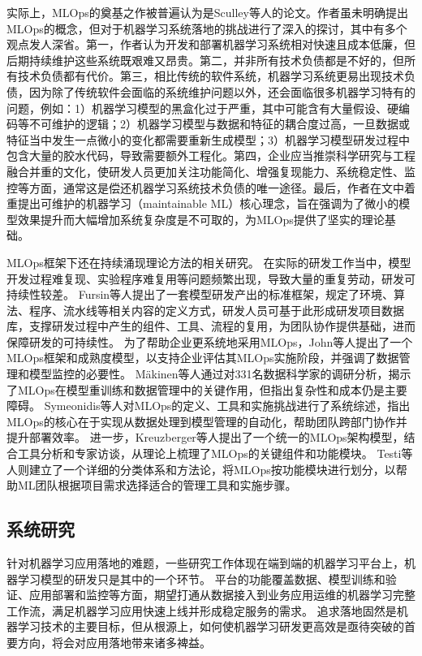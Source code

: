 实际上，MLOps的奠基之作被普遍认为是Sculley等人的论文\cite{Scu15}。作者虽未明确提出MLOps的概念，但对于机器学习系统落地的挑战进行了深入的探讨，其中有多个观点发人深省。第一，作者认为开发和部署机器学习系统相对快速且成本低廉，但后期持续维护这些系统既艰难又昂贵。第二，并非所有技术负债都是不好的，但所有技术负债都有代价。第三，相比传统的软件系统，机器学习系统更易出现技术负债，因为除了传统软件会面临的系统维护问题以外，还会面临很多机器学习特有的问题，例如：1）机器学习模型的黑盒化过于严重，其中可能含有大量假设、硬编码等不可维护的逻辑；2）机器学习模型与数据和特征的耦合度过高，一旦数据或特征当中发生一点微小的变化都需要重新生成模型；3）机器学习模型研发过程中包含大量的胶水代码，导致需要额外工程化。第四，企业应当推崇科学研究与工程融合并重的文化，使研发人员更加关注功能简化、增强复现能力、系统稳定性、监控等方面，通常这是偿还机器学习系统技术负债的唯一途径。最后，作者在文中着重提出可维护的机器学习（maintainable ML）核心理念，旨在强调为了微小的模型效果提升而大幅增加系统复杂度是不可取的，为MLOps提供了坚实的理论基础。

MLOps框架下还在持续涌现理论方法的相关研究。
在实际的研发工作当中，模型开发过程难复现、实验程序难复用等问题频繁出现，导致大量的重复劳动，研发可持续性较差。
Fursin等人\cite{Fur16}提出了一套模型研发产出的标准框架，规定了环境、算法、程序、流水线等相关内容的定义方式，研发人员可基于此形成研发项目数据库，支撑研发过程中产生的组件、工具、流程的复用，为团队协作提供基础，进而保障研发的可持续性。
为了帮助企业更系统地采用MLOps，John等人\cite{Joh21}提出了一个MLOps框架和成熟度模型，以支持企业评估其MLOps实施阶段，并强调了数据管理和模型监控的必要性。
Mäkinen等人\cite{Mak21}通过对331名数据科学家的调研分析，揭示了MLOps在模型重训练和数据管理中的关键作用，但指出复杂性和成本仍是主要障碍。
Symeonidis等人\cite{Sym22}对MLOps的定义、工具和实施挑战进行了系统综述，指出MLOps的核心在于实现从数据处理到模型管理的自动化，帮助团队跨部门协作并提升部署效率。
进一步，Kreuzberger等人\cite{Kre22}提出了一个统一的MLOps架构模型，结合工具分析和专家访谈，从理论上梳理了MLOps的关键组件和功能模块。
Testi等人\cite{Tes22}则建立了一个详细的分类体系和方法论，将MLOps按功能模块进行划分，以帮助ML团队根据项目需求选择适合的管理工具和实施步骤。

\subsection{系统研究}

针对机器学习应用落地的难题，一些研究工作体现在端到端的机器学习平台上\cite{Bay17, Sal18}，机器学习模型的研发只是其中的一个环节。
平台的功能覆盖数据、模型训练和验证、应用部署和监控等方面，期望打通从数据接入到业务应用运维的机器学习完整工作流，满足机器学习应用快速上线并形成稳定服务的需求。
追求落地固然是机器学习技术的主要目标，但从根源上，如何使机器学习研发更高效是亟待突破的首要方向，将会对应用落地带来诸多裨益。

